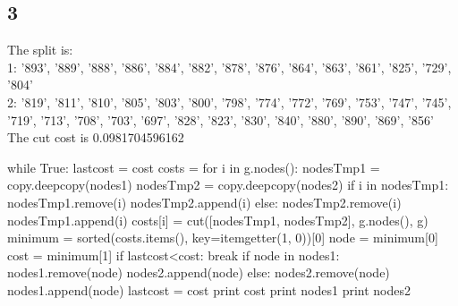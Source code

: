 \documentclass [11pt, a4paper, oneside] {article}
\begin{document}
\subsection *{3}
The split is:\\
1: '893', '889', '888', '886', '884', '882', '878', '876', '864', '863', '861', '825', '729', '804'\\
2: '819', '811', '810', '805', '803', '800', '798', '774', '772', '769', '753', '747', '745', '719', '713', '708', '703', '697', '828', '823', '830', '840', '880', '890', '869', '856'\\
The cut cost is 0.0981704596162\\
\begin{python}
while True:
    lastcost = cost
    costs = {}
    for i in g.nodes():
        nodesTmp1 = copy.deepcopy(nodes1)
        nodesTmp2 = copy.deepcopy(nodes2)
        if i in nodesTmp1:
            nodesTmp1.remove(i)
            nodesTmp2.append(i)
        else:
            nodesTmp2.remove(i)
            nodesTmp1.append(i)
        costs[i] = cut([nodesTmp1, nodesTmp2], g.nodes(), g)
    minimum = sorted(costs.items(), key=itemgetter(1, 0))[0]
    node = minimum[0]
    cost = minimum[1]
    if lastcost<cost:
        break
    if node in nodes1:
        nodes1.remove(node)
        nodes2.append(node)
    else:
        nodes2.remove(node)
        nodes1.append(node)
    lastcost = cost
    print cost
print nodes1
print nodes2
\end{python}
\end{document}
